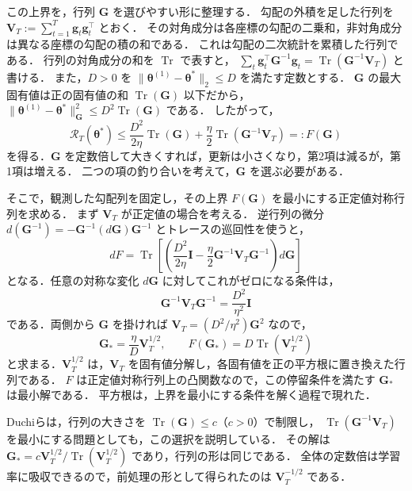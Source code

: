 \documentclass[../main.tex]{subfiles}
\begin{document}
この上界を，行列 $\bm{G}$ を選びやすい形に整理する．
勾配の外積を足した行列を $\bm{V}_T:=\sum_{t=1}^T\bm{g}_t\bm{g}_t^\top$ とおく．
その対角成分は各座標の勾配の二乗和，非対角成分は異なる座標の勾配の積の和である．
これは勾配の二次統計を累積した行列である．
行列の対角成分の和を $\operatorname{Tr}$ で表すと，
$\sum_t\bm{g}_t^\top\bm{G}^{-1}\bm{g}_t=\operatorname{Tr}(\bm{G}^{-1}\bm{V}_T)$ と書ける．
また，$D>0$ を $\|\bm{\theta}^{(1)}-\bm{\theta}^*\|_2\leq D$ を満たす定数とする．
$\bm{G}$ の最大固有値は正の固有値の和 $\operatorname{Tr}(\bm{G})$ 以下だから，
$\|\bm{\theta}^{(1)}-\bm{\theta}^*\|_{\bm{G}}^2\leq D^2\operatorname{Tr}(\bm{G})$ である．
したがって，
\begin{equation}
  \mathcal{R}_T(\bm{\theta}^*)
  \leq\frac{D^2}{2\eta}\operatorname{Tr}(\bm{G})
  +\frac{\eta}{2}\operatorname{Tr}(\bm{G}^{-1}\bm{V}_T)
  =:F(\bm{G})
  \label{eq:adagrad-trace-bound}
\end{equation}
を得る．$\bm{G}$ を定数倍して大きくすれば，更新は小さくなり，第2項は減るが，第1項は増える．
二つの項の釣り合いを考えて，$\bm{G}$ を選ぶ必要がある．

そこで，観測した勾配列を固定し，その上界 $F(\bm{G})$ を最小にする正定値対称行列を求める．
まず $\bm{V}_T$ が正定値の場合を考える．
逆行列の微分 $d(\bm{G}^{-1})=-\bm{G}^{-1}(d\bm{G})\bm{G}^{-1}$ とトレースの巡回性を使うと，
\[
  dF=\operatorname{Tr}\!\left[
  \left(\frac{D^2}{2\eta}\bm{I}
  -\frac{\eta}{2}\bm{G}^{-1}\bm{V}_T\bm{G}^{-1}\right)d\bm{G}\right]
\]
となる．任意の対称な変化 $d\bm{G}$ に対してこれがゼロになる条件は，
\begin{equation}
  \bm{G}^{-1}\bm{V}_T\bm{G}^{-1}
  =\frac{D^2}{\eta^2}\bm{I}
  \label{eq:adagrad-optimality}
\end{equation}
である．両側から $\bm{G}$ を掛ければ $\bm{V}_T=(D^2/\eta^2)\bm{G}^2$ なので，
\begin{equation}
  \bm{G}_*=\frac{\eta}{D}\bm{V}_T^{1/2},
  \qquad
  F(\bm{G}_*)=D\operatorname{Tr}(\bm{V}_T^{1/2})
  \label{eq:adagrad-optimal-metric}
\end{equation}
と求まる．$\bm{V}_T^{1/2}$ は，$\bm{V}_T$ を固有値分解し，各固有値を正の平方根に置き換えた行列である．
$F$ は正定値対称行列上の凸関数なので，この停留条件を満たす $\bm{G}_*$ は最小解である．
平方根は，上界を最小にする条件を解く過程で現れた．

Duchiらは，行列の大きさを $\operatorname{Tr}(\bm{G})\leq c$（$c>0$）で制限し，
$\operatorname{Tr}(\bm{G}^{-1}\bm{V}_T)$ を最小にする問題としても，この選択を説明している．
その解は $\bm{G}_*=c\bm{V}_T^{1/2}/\operatorname{Tr}(\bm{V}_T^{1/2})$ であり，行列の形は同じである．
全体の定数倍は学習率に吸収できるので，前処理の形として得られたのは $\bm{V}_T^{-1/2}$ である．
\end{document}
